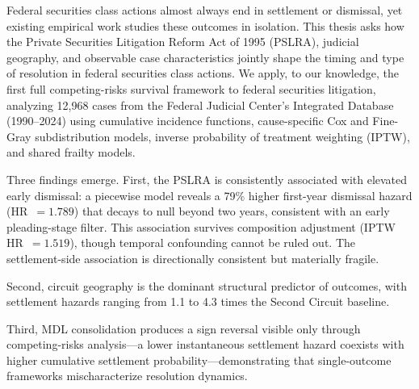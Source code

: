 Federal securities class actions almost always end in settlement or
dismissal, yet existing empirical work studies these outcomes in
isolation. This thesis asks how the Private Securities Litigation
Reform Act of 1995 (PSLRA), judicial geography, and observable case
characteristics jointly shape the timing and type of resolution in
federal securities class actions. We apply, to our knowledge, the
first full competing-risks survival framework to federal securities
litigation, analyzing 12,968 cases from the Federal Judicial Center's
Integrated Database (1990--2024) using cumulative incidence functions,
cause-specific Cox and Fine-Gray subdistribution models, inverse
probability of treatment weighting (IPTW), and shared frailty models.

Three findings emerge. First, the PSLRA is consistently associated
with elevated early dismissal: a piecewise model reveals a 79\% higher
first-year dismissal hazard (HR~$= 1.789$) that decays to null beyond
two years, consistent with an early pleading-stage filter. This
association survives composition adjustment (IPTW HR~$= 1.519$),
though temporal confounding cannot be ruled out. The settlement-side
association is directionally consistent but materially fragile. 

Second, circuit geography is the dominant structural predictor of
outcomes, with settlement hazards ranging from 1.1 to 4.3 times the
Second Circuit baseline. 

Third, MDL consolidation produces a sign reversal visible only through
competing-risks analysis---a lower instantaneous settlement hazard
coexists with higher cumulative settlement probability---demonstrating
that single-outcome frameworks mischaracterize resolution dynamics.